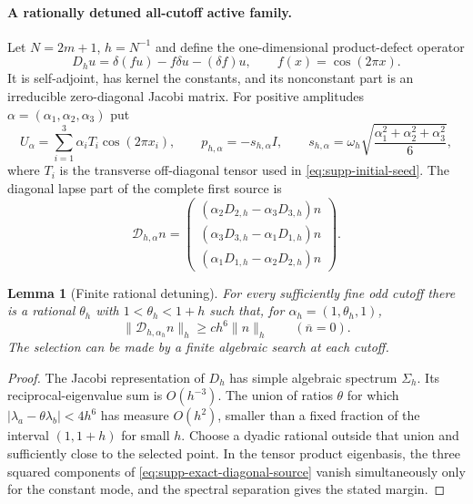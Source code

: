 \documentclass[11pt]{article}
\numberwithin{equation}{section}
\newtheorem{lemma}[lemma]{Lemma}
\theoremstyle{definition}
\theoremstyle{remark}
\begin{document}
\paragraph{A rationally detuned all-cutoff active family.}
Let $N=2m+1$, $h=N^{-1}$ and define the one-dimensional product-defect operator
\begin{equation}
 D_hu=\delta(fu)-f\delta u-(\delta f)u,
 \qquad f(x)=\cos(2\pi x).
 \label{eq:supp-exact-cosine-defect}
\end{equation}
It is self-adjoint, has kernel the constants, and its nonconstant part is an
irreducible zero-diagonal Jacobi matrix.  For positive amplitudes
$\alpha=(\alpha_1,\alpha_2,\alpha_3)$ put
\begin{equation}
 U_\alpha=\sum_{i=1}^3\alpha_iT_i\cos(2\pi x_i),\qquad
 p_{h,\alpha}=-s_{h,\alpha}I,
 \qquad
 s_{h,\alpha}=\omega_h\sqrt{\frac{\alpha_1^2+\alpha_2^2+\alpha_3^2}{6}},
 \label{eq:supp-exact-detuned-seed}
\end{equation}
where $T_i$ is the transverse off-diagonal tensor used in
\eqref{eq:supp-initial-seed}.  The diagonal lapse part of the complete first
source is
\begin{equation}
 \mathscr D_{h,\alpha}n=
 \begin{pmatrix}
 (\alpha_2D_{2,h}-\alpha_3D_{3,h})n\\
 (\alpha_3D_{3,h}-\alpha_1D_{1,h})n\\
 (\alpha_1D_{1,h}-\alpha_2D_{2,h})n
 \end{pmatrix}.
 \label{eq:supp-exact-diagonal-source}
\end{equation}

\begin{lemma}[Finite rational detuning]
\label{lem:supp-exact-rational-detuning}
For every sufficiently fine odd cutoff there is a rational
$\theta_h$ with $1<\theta_h<1+h$ such that, for
$\alpha_h=(1,\theta_h,1)$,
\begin{equation}
 \|\mathscr D_{h,\alpha_h}n\|_h\ge ch^6\|n\|_h
 \qquad(\overline n=0).
 \label{eq:supp-exact-diagonal-margin}
\end{equation}
The selection can be made by a finite algebraic search at each cutoff.
\end{lemma}
\begin{proof}
The Jacobi representation of $D_h$ has simple algebraic spectrum
$\Sigma_h$.  Its reciprocal-eigenvalue sum is $O(h^{-3})$.  The union of
ratios $\theta$ for which
$|\lambda_a-\theta\lambda_b|<4h^6$ has measure $O(h^2)$, smaller than a
fixed fraction of the interval $(1,1+h)$ for small $h$.  Choose a dyadic
rational outside that union and sufficiently close to the selected point.
In the tensor product eigenbasis, the three squared components of
\eqref{eq:supp-exact-diagonal-source} vanish simultaneously only for the
constant mode, and the spectral separation gives the stated margin.
\end{proof}
\end{document}
